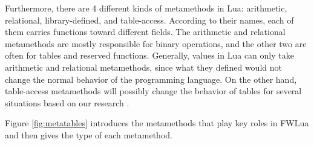 Furthermore, there are 4 different kinds of metamethods in Lua: arithmetic, relational, library-defined, and table-access. According to their names, each of them carries functions toward different fields. The arithmetic and relational metamethods are mostly responsible for binary operations, and the other two are often for tables and reserved functions. Generally, values in Lua can only take arithmetic and relational metamethods, since what they defined would not change the normal behavior of the programming language. On the other hand, table-access metamethods will possibly change the behavior of tables for several situations based on our research \cite{PIL}.

Figure \ref{fig:metatables} introduces the metamethods that play key roles in FWLua and then gives the type of each metamethod.


